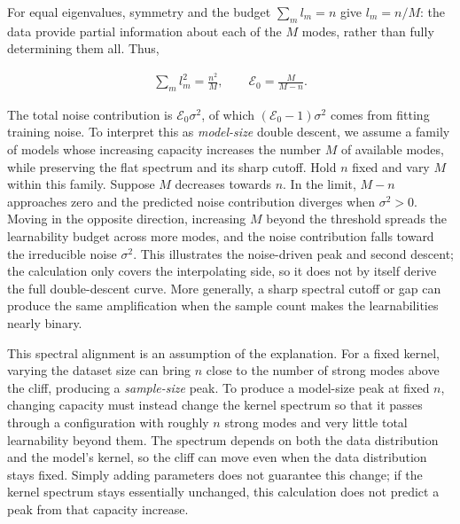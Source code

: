 For equal eigenvalues,
symmetry and the budget $\sum_m l_m=n$ give $l_m=n/M$: the data provide partial
information about each of the $M$ modes, rather than fully determining them all. Thus,

\begin{align}
    \sum_m l_m^2=\frac{n^2}{M},
    \qquad
    \mathcal{E}_0 = \frac{M}{M-n}.
\end{align}

The total noise contribution is $\mathcal{E}_0\sigma^2$, of which
$(\mathcal{E}_0-1)\sigma^2$ comes from fitting training noise. To interpret this as
\textit{model-size} double descent, we assume a family of models whose increasing
capacity increases the number $M$ of available modes, while preserving the flat
spectrum and its sharp cutoff. Hold $n$ fixed and vary $M$ within this family.
Suppose $M$ decreases towards $n$. In the limit, $M-n$ approaches zero and the predicted
noise contribution diverges when $\sigma^2>0$. Moving in the opposite direction,
increasing $M$ beyond the threshold spreads the learnability budget across more
modes, and the noise contribution falls toward the irreducible noise $\sigma^2$.
This illustrates the noise-driven peak and second descent; the calculation only
covers the interpolating side, so it does not by itself derive the full
double-descent curve. More generally, a sharp spectral cutoff or gap can produce
the same amplification when the sample count makes the learnabilities nearly binary.

This spectral alignment is an assumption of the explanation. For a fixed kernel,
varying the dataset size can bring $n$ close to the number of strong modes above
the cliff, producing a \textit{sample-size} peak. To produce a model-size peak at
fixed $n$, changing capacity must instead change the kernel spectrum so that it
passes through a configuration with roughly $n$ strong modes and very little total
learnability beyond them. The spectrum depends on both the data distribution and
the model's kernel, so the cliff can move even when the data distribution stays
fixed. Simply adding parameters does not guarantee this change; if the kernel
spectrum stays essentially unchanged, this calculation does not predict a peak
from that capacity increase.

